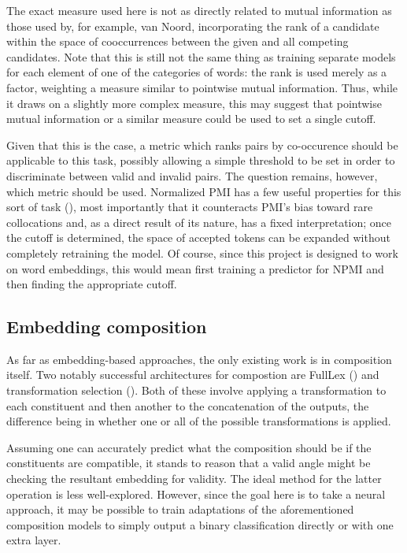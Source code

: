 \documentclass[a4paper, 12pt]{article}
\begin{document}
The exact measure used here is not as directly related to mutual information as those used by, for example, van Noord, incorporating the rank of a candidate within the space of cooccurrences between the given and all competing candidates. Note that this is still not the same thing as training separate models for each element of one of the categories of words: the rank is used merely as a factor, weighting a measure similar to pointwise mutual information. Thus, while it draws on a slightly more complex measure, this may suggest that pointwise mutual information or a similar measure could be used to set a single cutoff.

Given that this is the case, a metric which ranks pairs by co-occurence should be applicable to this task, possibly allowing a simple threshold to be set in order to discriminate between valid and invalid pairs. The question remains, however, which metric should be used. Normalized PMI has a few useful properties for this sort of task (\cite{BoumaNPMI}), most importantly that it counteracts PMI's bias toward rare collocations and, as a direct result of its nature, has a fixed interpretation; once the cutoff is determined, the space of accepted tokens can be expanded without completely retraining the model. Of course, since this project is designed to work on word embeddings, this would mean first training a predictor for NPMI and then finding the appropriate cutoff.

\subsection{Embedding composition}

As far as embedding-based approaches, the only existing work is in composition itself. Two notably successful architectures for compostion are FullLex (\cite{SocherFullLex}) and transformation selection (\cite{TSelect}). Both of these involve applying a transformation to each constituent and then another to the concatenation of the outputs, the difference being in whether one or all of the possible transformations is applied.

Assuming one can accurately predict what the composition should be if the constituents are compatible, it stands to reason that a valid angle might be checking the resultant embedding for validity. The ideal method for the latter operation is less well-explored. However, since the goal here is to take a neural approach, it may be possible to train adaptations of the aforementioned composition models to simply output a binary classification directly or with one extra layer.
\end{document}
